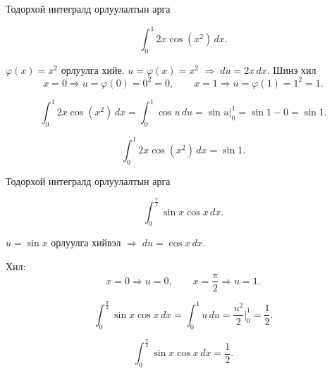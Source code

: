 \begin{frame}[allowframebreaks]{Тодорхой интегралд орлуулалтын арга}
\begin{example}
\[
\int_0^1 2x\cos(x^2)\,dx.
\]

$\varphi(x)=x^2$ орлуулга хийе. \quad $u=\varphi(x)=x^2$ \;\; $\Rightarrow\; du=2x\,dx$.
Шинэ хил  
\[
x=0\Rightarrow u=\varphi(0)=0^2=0,\qquad x=1\Rightarrow u=\varphi(1)=1^2=1.
\]

\[
\int_0^1 2x\cos(x^2)\,dx
=
\int_0^1 \cos u\,du
=
\sin u\Big|_0^1
=\sin1-0=\sin1.
\]

\[
\boxed{\int_0^1 2x\cos(x^2)\,dx=\sin1.}
\]

\end{example}
\end{frame}

\begin{frame}[allowframebreaks]{Тодорхой интегралд орлуулалтын арга}
\begin{example}
\[
\int_0^{\frac{\pi}{2}}\sin x\cos x\,dx.
\]

 $u=\sin x$  орлуулга хийвэл $\Rightarrow\; du=\cos x\,dx$.

Хил:
\[
x=0\Rightarrow u=0,\qquad x=\frac{\pi}{2}\Rightarrow u=1.
\]

\[
\int_0^{\frac{\pi}{2}}\sin x\cos x\,dx
=
\int_0^{1} u\,du
=
\frac{u^2}{2}\Big|_0^1
=\frac12.
\]

\[
\boxed{\displaystyle \int_0^{\frac{\pi}{2}}\sin x\cos x\,dx=\frac12.}
\]

\end{example}
\end{frame}


